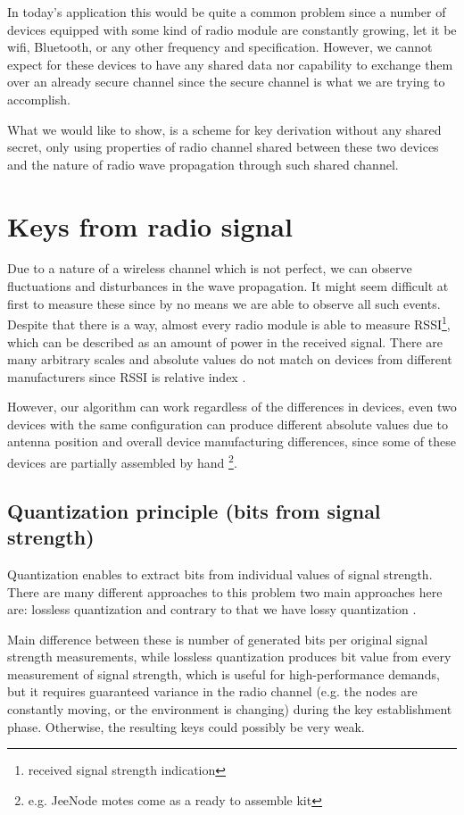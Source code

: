 \documentclass[
  print, %
  table,   %
  nolof,     %
  nolot,     %
           oneside
]{fithesis3}
\begin{document}
  In today's application this would be quite a common problem since a number of devices equipped with some kind of radio module are constantly growing, let it be wifi, Bluetooth, or any other frequency and specification. However, we cannot expect for these devices to have any shared data nor capability to exchange them over an already secure channel since the secure channel is what we are trying to accomplish.

  What we would like to show, is a scheme for key derivation without any shared secret, only using properties of radio channel shared between these two devices and the nature of radio wave propagation through such shared channel.

  \section{Keys from radio signal}
  Due to a nature of a wireless channel which is not perfect, we can observe fluctuations and disturbances in the wave propagation. It might seem difficult at first to measure these since by no means we are able to observe all such events. Despite that there is a way, almost every radio module is able to measure RSSI\footnote{received signal strength indication}, which can be described as an amount of power in the received signal. There are many arbitrary scales and absolute values do not match on devices from different manufacturers since RSSI is relative index \cite{RSSIMeaning}.

  However, our algorithm can work regardless of the differences in devices, even two devices with the same configuration can produce different absolute values due to antenna position and overall device manufacturing differences, since some of these devices are partially assembled by hand \footnote{e.g. JeeNode motes come as a ready to assemble kit}.

  \subsection{Quantization principle (bits from signal strength)}
    Quantization enables to extract bits from individual values of signal strength. There are many different approaches to this problem \cite{Jana2009Rssi}
    two main approaches here are: lossless quantization \cite{Azimi-Sadjadi2010Fading}
    and contrary to that we have lossy quantization \cite{Mathur2008Rssi}. %


    Main difference between these is number of generated bits per original signal strength measurements, while lossless quantization produces bit value from every measurement of signal strength, which is useful for high-performance demands, but it requires guaranteed variance in the radio channel (e.g. the nodes are constantly moving, or the environment is changing) during the key establishment phase. %
    Otherwise, the resulting keys could possibly be very weak. %
\end{document}
